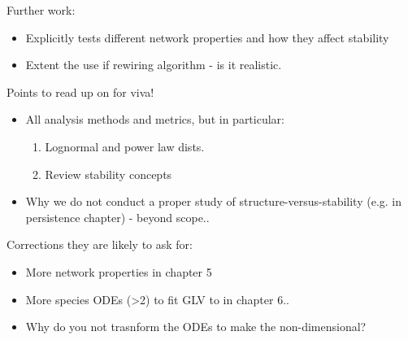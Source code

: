 Further work:
\begin{itemize}
	\item Explicitly tests different network properties and how they affect stability 
	\item Extent the use if rewiring algorithm - is it realistic.
\end{itemize}

Points to read up on for viva!

\begin{itemize}
	\item All analysis methods and metrics, but in particular:
	\begin{enumerate}
		\item Lognormal and power law dists. \cite{mcgill2007species}
		\item Review stability concepts \cite{donohue2013dimensionality}
	\end{enumerate}		
	
	\item Why we do not conduct a proper study of structure-versus-stability (e.g. in persistence chapter) - beyond scope..
\end{itemize}


Corrections they are likely to ask for:

\begin{itemize}
	\item More network properties in chapter 5
	\item More species ODEs (>2) to fit GLV to in chapter 6..
	\item Why do you not trasnform the ODEs to make the non-dimensional?
\end{itemize}